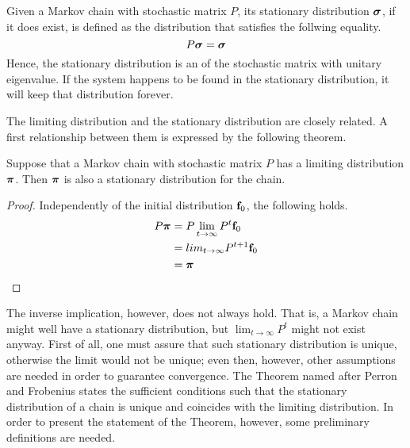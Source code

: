 \begin{ndef} 
    Given a Markov chain with stochastic matrix $P$, its stationary distribution $\boldsymbol{\sigma}$, if it does exist, is defined as the distribution that satisfies the follwing equality.
    \begin{equation}
        P \boldsymbol{\sigma} = \boldsymbol{\sigma}
    \end{equation}
    Hence, the stationary distribution is an  of the stochastic matrix with unitary eigenvalue. If the system happens to be found in the stationary distribution, it will keep that distribution forever.
\end{ndef}
The limiting distribution and the stationary distribution are closely related. A first relationship between them is expressed by the following theorem.

\begin{theorem} \label{th:limit-stat}
    Suppose that a Markov chain with stochastic matrix $P$ has a limiting distribution $\boldsymbol{\pi}$. Then $\boldsymbol{\pi}$ is also a stationary distribution for the chain.
\end{theorem}
\begin{proof}
    Independently of the initial distribution $\mathbf{f}_0$, the following holds.
    \begin{align}
        P \boldsymbol{\pi}
         & = P \lim_{t \rightarrow \infty} P^t \mathbf{f}_0  \\
         & = lim_{t \rightarrow \infty} P^{t+1} \mathbf{f}_0 \\
         & = \boldsymbol{\pi}
    \end{align}
\end{proof}
The inverse implication, however, does not always hold. That is, a Markov chain might well have a stationary distribution, but $\lim_{t \rightarrow \infty} P^t$ might not exist anyway. First of all, one must assure that such stationary distribution is unique, otherwise the limit would not be unique; even then, however, other assumptions are needed in order to guarantee convergence. The Theorem named after Perron and Frobenius states the sufficient conditions such that the stationary distribution of a chain is unique and coincides with the limiting distribution. In order to present the statement of the Theorem, however, some preliminary definitions are needed. 

